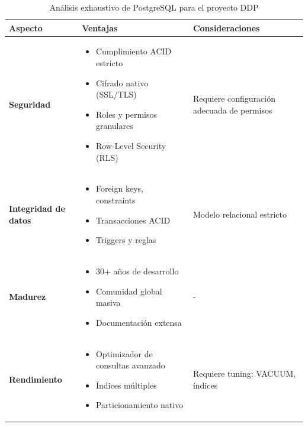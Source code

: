 \begin{table}[h]
\centering
\caption{Análisis exhaustivo de PostgreSQL para el proyecto DDP}
\label{tab:postgresql-analisis}
\begin{tabular}{|p{3.5cm}|p{4.5cm}|p{4cm}|}
\hline
\textbf{Aspecto} & \textbf{Ventajas} & \textbf{Consideraciones} \\
\hline
\textbf{Seguridad} & 
\begin{minipage}[t]{4.5cm}
\begin{itemize}
    \item Cumplimiento ACID estricto
    \item Cifrado nativo (SSL/TLS)
    \item Roles y permisos granulares
    \item Row-Level Security (RLS)
\end{itemize}
\end{minipage} & 
Requiere configuración adecuada de permisos \\
\hline
\textbf{Integridad de datos} & 
\begin{minipage}[t]{4.5cm}
\begin{itemize}
    \item Foreign keys, constraints
    \item Transacciones ACID
    \item Triggers y reglas
\end{itemize}
\end{minipage} & 
Modelo relacional estricto \\
\hline
\textbf{Madurez} & 
\begin{minipage}[t]{4.5cm}
\begin{itemize}
    \item 30+ años de desarrollo
    \item Comunidad global masiva
    \item Documentación extensa
\end{itemize}
\end{minipage} & - \\
\hline
\textbf{Rendimiento} & 
\begin{minipage}[t]{4.5cm}
\begin{itemize}
    \item Optimizador de consultas avanzado
    \item Índices múltiples
    \item Particionamiento nativo
\end{itemize}
\end{minipage} & 
Requiere tuning: VACUUM, índices \\
\hline
\end{tabular}
\end{table}

